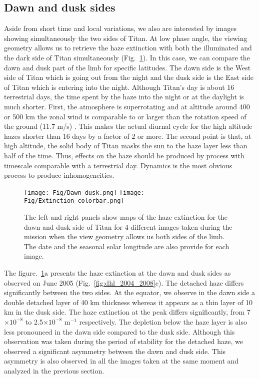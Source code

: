 \subsection{Dawn and dusk sides}

Aside from short time and local variations, we also are interested by images showing simultaneously the two sides
of Titan. At low phase angle, the viewing geometry allows us to retrieve the haze extinction with both the
illuminated and the dark side of Titan simultaneously  (Fig.~\ref{fig:dawn_dusk}).
In this case, we can compare the dawn and dusk part of the limb for
specific latitudes. The dawn side is the West side of Titan which is going out from the night and the
dusk side is the East side of Titan which is entering into the night. Although Titan's day is about 16 terrestrial
days, the time spent by the haze into the night or at the daylight is much shorter.
First, the atmosphere is superrotating and at altitude around 400 or 500 km the zonal wind is comparable to or
larger than the rotation speed of the ground (11.7 m/s) \citep{Flasar2005, Lebonnois2012}.
This makes the actual diurnal cycle for the high altitude hazes shorter than 16 days by a factor of 2 or more.
The second point is that, at high altitude, the solid body of Titan masks the sun to the haze layer less than
half of the time. Thus, effects on the haze should be produced by process with timescale
comparable with a terrestrial day. Dynamics is the most obvious process to produce inhomogeneities.

\begin{figure}[!ht]
    \centering
    \texttt{[image: Fig/Dawn\_dusk.png]}
    \texttt{[image: Fig/Extinction\_colorbar.png]}\vspace{-.3cm}
    \caption{The left and right panels show maps of the haze extinction for the dawn and dusk side of
    Titan for 4 different images taken during the mission when the view geometry allows us both sides
    of the limb. The date and the seasonal solar longitude are also provide for each image.}
    \label{fig:dawn_dusk}
\end{figure}

The figure.~\ref{fig:dawn_dusk}a presents the haze extinction at the dawn and dusk sides as observed
on June 2005 (Fig.~\ref{fig:dhl_2004_2008}c). The detached haze differs significantly between the two sides.
At the equator, we observe in the dawn side a double detached layer of 40 km thickness whereas it appears
as a thin layer of 10 km in the dusk side. The haze extinction at the peak differs significantly,
from 7$\times 10^{-8}$ to 2.5$\times 10^{-8}$ m$^{-1}$ respectively. The depletion below the haze layer
is also less pronounced in the dawn side compared to the dusk side. Although this observation was taken
during the period of stability for the detached haze, we observed a significant asymmetry between
the dawn and dusk side. This asymmetry is also observed in all the images taken at the same moment and
analyzed in the previous section.

